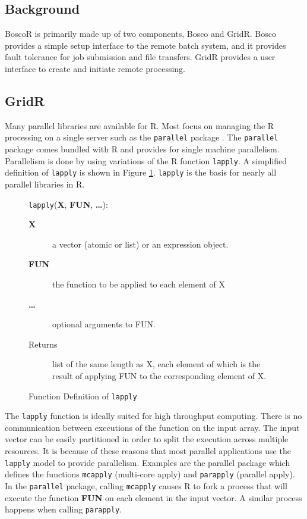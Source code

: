 \subsection{Background}
BoscoR is primarily made up of two components, Bosco and GridR.  Bosco provides a simple setup interface to the remote batch system, and it provides fault tolerance for job submission and file transfers.  GridR provides a user interface to create and initiate remote processing.


\subsection{GridR}
Many parallel libraries are available for R.  Most focus on managing the R processing on a single server such as the \texttt{parallel} package \cite{rparallelpackage}.  The \texttt{parallel} package comes bundled with R and provides for single machine parallelism.  Parallelism is done by using variations of the R function \texttt{lapply}.  A simplified definition of \texttt{lapply} is shown in Figure \ref{lst:lapply}.  \texttt{lapply} is the basis for nearly all parallel libraries in R.  

\begin{figure}[h!t]
\begin{framed}
\texttt{lapply}(\textbf{X}, \textbf{FUN}, \textbf{\ldots}):
\begin{description}
\item[\textbf{X}] a vector (atomic or list) or an expression object.
\item[\textbf{FUN}] the function to be applied to each element of X
\item[\textbf{\ldots}] optional arguments to FUN.
\item[Returns] list of the same length as X, each element of which is the result of applying FUN to the corresponding element of X.
\end{description}
\end{framed}

\centering
\captionsetup{justification=centering}
\caption{Function Definition of \texttt{lapply}}
\label{lst:lapply}
\end{figure}

The \texttt{lapply} function is ideally suited for high throughput computing.  There is no communication between executions of the function on the input array.  The input vector can be easily partitioned in order to split the execution across multiple resources.  It is because of these reasons that most parallel applications use the \texttt{lapply} model to provide parallelism.  Examples are the parallel package which defines the functions \texttt{mcapply} (multi-core apply) and \texttt{parapply} (parallel apply). In the \texttt{parallel} package, calling \texttt{mcapply} causes R to fork a process that will execute the function \textbf{FUN} on each element in the input vector.  A similar process happens when calling \texttt{parapply}. 


